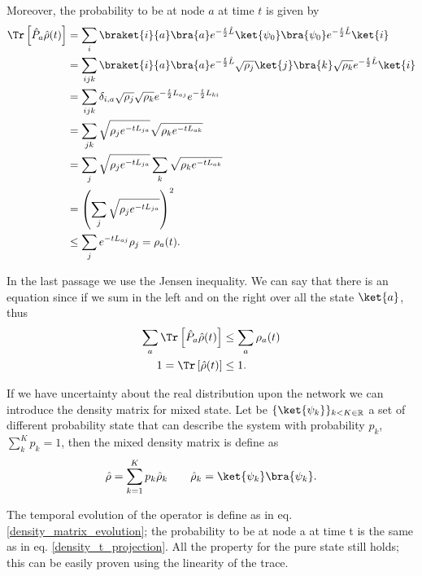 Moreover, the probability to be at node $a$ at time $t$ is given by
\begin{equation}\label{density_t_projection}
    \begin{split}
       \Tr\left[\hat P_a\hat\rho(t)\right] &= \sum_i \braket{i}{a}\bra{a} e^{-\frac{t}{2}\hat L} \ket{\psi_0}\bra{\psi_0}e^{-\frac{t}{2}\hat L}\ket{i}\\
        &= \sum_{ijk} \braket{i}{a}\bra{a} e^{-\frac{t}{2}\hat L} \sqrt{\rho_j}\ket{j}\bra{k}\sqrt{\rho_k}e^{-\frac{t}{2}\hat L}\ket{i}\\
        &= \sum_{ijk}\delta_{i,a}\sqrt{\rho_j}\sqrt{\rho_k}e^{-\frac{t}{2} L_{aj}}e^{-\frac{t}{2}L_{ki}}\\
        &= \sum_{jk}\sqrt{\rho_je^{-tL_{ja}}}\sqrt{\rho_k e^{-t L_{ak}}}\\
        &= \sum_{j}\sqrt{\rho_je^{-tL_{ja}}}\sum_k\sqrt{\rho_k e^{-t L_{ak}}}\\
        &= \left(\sum_{j}\sqrt{\rho_je^{-tL_{ja}}}\right)^2\\
        &\leq \sum_{j} e^{-tL_{aj}}\rho_j = \rho_a(t).
    \end{split}
\end{equation}

In the last passage we use the Jensen inequality. We can say that there is an equation since if we sum in the left and on the right over all the state $\ket{a}$, thus
\begin{equation}
   \begin{split}
        \sum_a\Tr\left[\hat P_a\hat\rho(t)\right] &\leq \sum_a\rho_a(t)\\
        1=\Tr\left[\hat\rho(t)\right] &\leq 1.
   \end{split}
\end{equation}



If we have uncertainty about the real distribution upon the network we can introduce the density matrix for mixed state. Let be $\{\ket{\psi_k}\}_{k<K\in\mathbb{R}}$ a set of different probability state that can describe the system with probability $p_k$, $\sum_k^K p_k = 1$, then the mixed density matrix is define as
\begin{equation}
    \hat \rho = \sum_{k=1}^K p_k \hat \rho_k \qquad \hat\rho_k = \ket{\psi_k}\bra{\psi_k}.
\end{equation}

The temporal evolution of the operator is define as in eq. \eqref{density_matrix_evolution}; the probability to be at node a at time t is the same as in eq. \eqref{density_t_projection}. All the property for the pure state still holds; this can be easily proven using the linearity of the trace.


